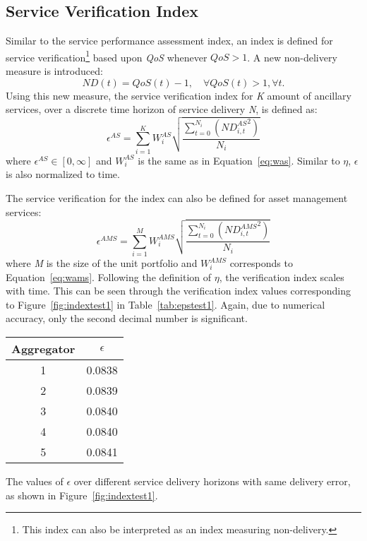 \FloatBarrier

\subsection{Service Verification Index}
Similar to the service performance assessment index, an index is defined for service verification\footnote{This index can also be interpreted as an index measuring non-delivery.} based upon \emph{QoS} whenever $QoS > 1$. A new non-delivery measure is introduced:
\begin{equation}
	ND(t) = QoS(t) - 1,\quad \forall QoS(t) > 1, \forall t.
\end{equation}
Using this new measure, the service verification index for \emph{K} amount of ancillary services, over a discrete time horizon of service delivery \emph{N}, is defined as:
\begin{equation}\label{eq:epsilonASmain}
	\epsilon^{AS} = \sum^{K}_{i=1} W^{AS}_i \sqrt{\frac{\sum^{N_i}_{t=0} \left( {ND^{AS}_{i,t}}^{2} \right)}{N_i}}
\end{equation}
where $\epsilon^{AS} \in [0,\infty]$ and $W^{AS}_i$ is the same as in Equation~\eqref{eq:was}. Similar to $\eta$, $\epsilon$ is also normalized to time.

The service verification for the index can also be defined for asset management services:
\begin{equation}\label{eq:epsilonAMSmain}
	\epsilon^{AMS} = \sum^{M}_{i=1} W^{AMS}_i \sqrt{\frac{\sum^{N_i}_{t=0} \left( {ND^{AMS}_{i,t}}^{2} \right)}{N_i}}
\end{equation}
where  \emph{M} is the size of the unit portfolio and $W^{AMS}_i$ corresponds to Equation~\eqref{eq:wams}. Following the definition of $\eta$, the verification index scales with time. This can be seen through the verification index values corresponding to Figure~\ref{fig:indextest1} in Table~\ref{tab:epstest1}. Again, due to numerical accuracy, only the second decimal number is significant.
\begin{margintable}%
	\centering
	\begin{tabular}{cc}
		\toprule
		Aggregator & $\epsilon$ \\
		\midrule
		1 & 0.0838 \\
		2 & 0.0839  \\
		3 & 0.0840  \\
		4 & 0.0840  \\
		5 & 0.0841 \\
		\bottomrule
	\end{tabular}
	\caption{The values of $\epsilon$ over different service delivery horizons with same delivery error, as shown in Figure~\ref{fig:indextest1}.}
	\label{tab:epstest1}
\end{margintable}

